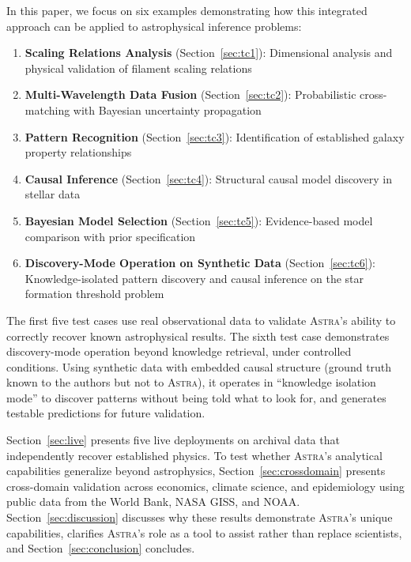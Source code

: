 \documentclass[fleqn,usenatbib]{mnras}
\newcommand{\astra}{\textsc{Astra}\xspace}
\begin{document}
In this paper, we focus on six examples demonstrating how this integrated approach can be applied to astrophysical inference problems:
\begin{enumerate}
  \item[(i)] \textbf{Scaling Relations Analysis} (Section~\ref{sec:tc1}): Dimensional analysis and physical validation of filament scaling relations
  \item[(ii)] \textbf{Multi-Wavelength Data Fusion} (Section~\ref{sec:tc2}): Probabilistic cross-matching with Bayesian uncertainty propagation
  \item[(iii)] \textbf{Pattern Recognition} (Section~\ref{sec:tc3}): Identification of established galaxy property relationships
  \item[(iv)] \textbf{Causal Inference} (Section~\ref{sec:tc4}): Structural causal model discovery in stellar data
  \item[(v)] \textbf{Bayesian Model Selection} (Section~\ref{sec:tc5}): Evidence-based model comparison with prior specification
  \item[(vi)] \textbf{Discovery-Mode Operation on Synthetic Data} (Section~\ref{sec:tc6}): Knowledge-isolated pattern discovery and causal inference on the star formation threshold problem
\end{enumerate}

The first five test cases use real observational data to validate \astra's ability to correctly recover known astrophysical results.
The sixth test case demonstrates discovery-mode operation beyond knowledge retrieval, under controlled conditions.
Using synthetic data with embedded causal structure (ground truth known to the authors but not to \astra), it operates in ``knowledge isolation mode'' to discover patterns without being told what to look for, and generates testable predictions for future validation.

Section~\ref{sec:live} presents five live deployments on archival data that independently recover established physics.
To test whether \astra's analytical capabilities generalize beyond astrophysics, Section~\ref{sec:crossdomain} presents cross-domain validation across economics, climate science, and epidemiology using public data from the World Bank, NASA GISS, and NOAA.
Section~\ref{sec:discussion} discusses why these results demonstrate \astra's unique capabilities, clarifies \astra's role as a tool to assist rather than replace scientists, and Section~\ref{sec:conclusion} concludes.

\end{document}
